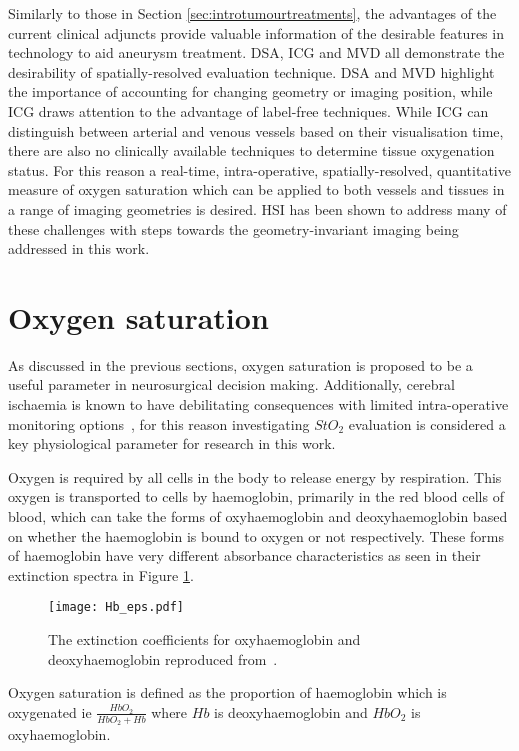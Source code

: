 Similarly to those in Section \ref{sec:introtumourtreatments}, the advantages of the current clinical adjuncts provide valuable information of the desirable features in technology to aid aneurysm treatment. DSA, ICG and MVD all demonstrate the desirability of spatially-resolved evaluation technique. DSA and MVD highlight the importance of accounting for changing geometry or imaging position, while ICG draws attention to the advantage of label-free techniques. While ICG can distinguish between arterial and venous vessels based on their visualisation time, there are also no clinically available techniques to determine tissue oxygenation status. For this reason a real-time, intra-operative, spatially-resolved, quantitative measure of oxygen saturation which can be applied to both vessels and tissues in a range of imaging geometries is desired. HSI has been shown to address many of these challenges with steps towards the geometry-invariant imaging being addressed in this work. 

\section{Oxygen saturation}\label{sec:oxygensat}
As discussed in the previous sections, oxygen saturation is proposed to be a useful parameter in neurosurgical decision making. Additionally, cerebral ischaemia is known to have debilitating consequences with limited intra-operative monitoring options~\citep{Zhou2016}, for this reason investigating $StO_2$ evaluation is considered a key physiological parameter for research in this work. 

Oxygen is required by all cells in the body to release energy by respiration. This oxygen is transported to cells by haemoglobin, primarily in the red blood cells of blood, which can take the forms of oxyhaemoglobin and deoxyhaemoglobin based on whether the haemoglobin is bound to oxygen or not respectively. These forms of haemoglobin have very different absorbance characteristics as seen in their extinction spectra in Figure \ref{fig:Haemoglobinext}. 
\begin{figure}[h]
    \centering 
    \texttt{[image: Hb\_eps.pdf]}
    \caption{The extinction coefficients for oxyhaemoglobin and deoxyhaemoglobin reproduced from~\citet{Prahl1998}.}
    \label{fig:Haemoglobinext}
\end{figure}
Oxygen saturation is defined as the proportion of haemoglobin which is oxygenated ie $\frac{HbO_2}{HbO_2 + Hb}$ where $Hb$ is deoxyhaemoglobin and $HbO_2$ is oxyhaemoglobin. 

